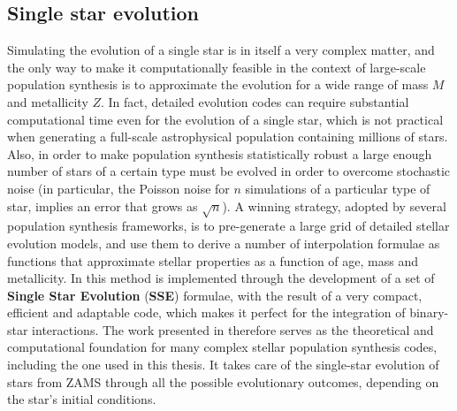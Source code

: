 \subsection{Single star evolution}
Simulating the evolution of a single star is in itself a very complex matter, and the only way to make it computationally feasible in the context of large-scale population synthesis is to approximate the evolution for a wide range of mass $M$ and metallicity $Z$. 
In fact, detailed evolution codes can require substantial computational time even for the evolution of a single star, which is not practical when generating a full-scale astrophysical population containing millions of stars. 
Also, in order to make population synthesis statistically robust a large enough number of stars of a certain type must be evolved in order to overcome stochastic noise (in particular, the Poisson noise for $n$ simulations of a particular type of star, implies an error that grows as $\sqrt{n}$).
A winning strategy, adopted by several population synthesis frameworks, is to pre-generate a large grid of detailed stellar evolution models, and use them to derive a number of interpolation formulae as functions that approximate stellar properties as a function of age, mass and metallicity. 
In \cite{SSE} this method is implemented through the development of a set of \textbf{Single Star Evolution} (\textbf{SSE}) formulae, with the result of a very compact, efficient and adaptable code, which makes it perfect for the integration of binary-star interactions.
The work presented in \cite{SSE} therefore serves as the theoretical and computational foundation for many complex stellar population synthesis codes, including the one used in this thesis. It takes care of the single-star evolution of stars from ZAMS through all the possible evolutionary outcomes, depending on the star's initial conditions.

